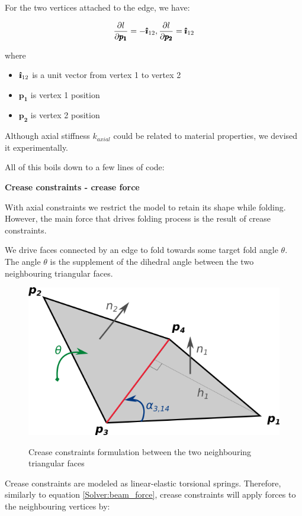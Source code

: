 For the two vertices attached to the edge, we have:

$$ \frac{\partial l}{\partial \pmb{p_{1}}} = -\pmb{\hat{\imath}}_{12}, \frac{\partial l}{\partial \pmb{p_{2}}} = \pmb{\hat{\imath}}_{12} $$

where
\begin{itemize}
	\item $\pmb{\hat{\imath}}_{12}$ is a unit vector from vertex 1 to vertex 2
	\item $\pmb{p_{1}}$ is vertex 1 position
	\item $\pmb{p_{2}}$ is vertex 2 position
\end{itemize}

Although axial stiffness $k_{axial}$ could be related to material properties, we devised it experimentally.

All of this boils down to a few lines of code:




\medskip
\textbf{Crease constraints - crease force}

With axial constraints we restrict the model to retain its shape while folding.
However, the main force that drives folding process is the result of crease constraints.
\smallskip

We drive faces connected by an edge to fold towards some target fold angle $\theta$.
The angle $\theta$ is the supplement of the dihedral angle between the two neighbouring triangular faces.

\begin{figure}[H]
	\caption{Crease constraints formulation between the two neighbouring triangular faces}
    \centering
	\includegraphics[width=.6\linewidth]{assets/3-crease_force_face.png}
	\label{Solver:crease_force_face}
\end{figure}

Crease constraints are modeled as linear-elastic torsional springs.
Therefore, similarly to equation \eqref{Solver:beam_force}, crease constraints will apply forces to the neighbouring
vertices by:

